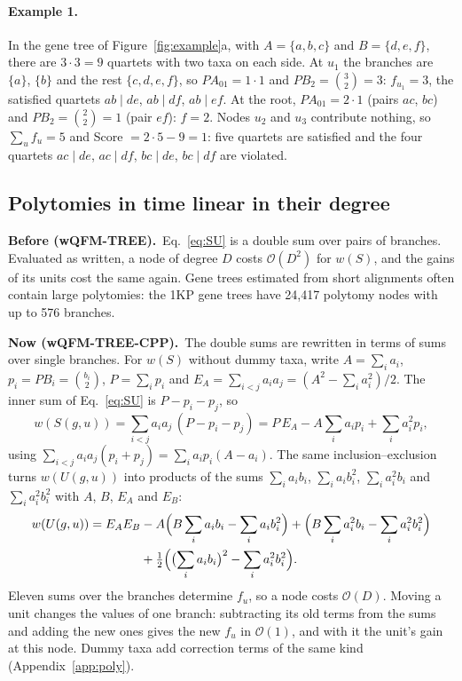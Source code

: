\documentclass[11pt,a4paper]{article}
\newcommand{\wqfmtree}{wQFM-TREE}
\newcommand{\cpp}{wQFM-TREE-CPP}
\newcommand{\Oh}{\mathcal{O}}
\newcommand{\Before}{\par\smallskip\noindent\textbf{\textcolor{beforec}{Before (\wqfmtree).}}\ }
\newcommand{\Now}{\par\smallskip\noindent\textbf{\textcolor{nowc}{Now (\cpp).}}\ }
\begin{document}
\paragraph{Example 1.} In the gene tree of Figure~\ref{fig:example}a, with $A=\{a,b,c\}$ and
$B=\{d,e,f\}$, there are $3\cdot3=9$ quartets with two taxa on each side. At $u_1$ the branches are
$\{a\}$, $\{b\}$ and the rest $\{c,d,e,f\}$, so $PA_{01}=1\cdot1$ and $PB_2=\binom32=3$: $f_{u_1}=3$,
the satisfied quartets $ab\mid de$, $ab\mid df$, $ab\mid ef$. At the root, $PA_{01}=2\cdot1$ (pairs
$ac$, $bc$) and $PB_2=\binom22=1$ (pair $ef$): $f=2$. Nodes $u_2$ and $u_3$ contribute nothing, so
$\sum_u f_u=5$ and Score $=2\cdot5-9=1$: five quartets are satisfied and the four quartets
$ac\mid de$, $ac\mid df$, $bc\mid de$, $bc\mid df$ are violated.

\subsection{Polytomies in time linear in their degree}\label{sec:closed}

\Before Eq.~\eqref{eq:SU} is a double sum over pairs of branches. Evaluated as written, a node of
degree $D$ costs $\Oh(D^2)$ for $w(S)$, and the gains of its units cost the same again. Gene trees
estimated from short alignments often contain large polytomies: the 1KP gene trees have 24{,}417
polytomy nodes with up to 576 branches.

\Now The double sums are rewritten in terms of sums over single branches. For $w(S)$ without dummy
taxa, write $A=\sum_ia_i$, $p_i=PB_i=\binom{b_i}{2}$, $P=\sum_ip_i$ and
$E_A=\sum_{i<j}a_ia_j=(A^2-\sum_ia_i^2)/2$. The inner sum of Eq.~\eqref{eq:SU} is
$P-p_i-p_j$, so
\begin{equation}\label{eq:S-closed}
  w(S(g,u)) = \sum_{i<j}a_ia_j\,(P-p_i-p_j)
  = P\,E_A - A\sum_i a_ip_i + \sum_i a_i^2p_i ,
\end{equation}
using $\sum_{i<j}a_ia_j(p_i+p_j)=\sum_{i}a_ip_i(A-a_i)$. The same inclusion--exclusion turns
$w(U(g,u))$ into products of the sums $\sum_ia_ib_i$, $\sum_ia_ib_i^2$, $\sum_ia_i^2b_i$ and
$\sum_ia_i^2b_i^2$ with $A$, $B$, $E_A$ and $E_B$:
\begin{equation}\label{eq:U-closed}
\begin{split}
  w(U(g,u)) = E_AE_B &- A\Bigl(B\sum_i a_ib_i - \sum_i a_ib_i^2\Bigr)
     + \Bigl(B\sum_i a_i^2b_i - \sum_i a_i^2b_i^2\Bigr)\\
     &+ \tfrac12\Bigl(\bigl(\sum_i a_ib_i\bigr)^2 - \sum_i a_i^2b_i^2\Bigr).
\end{split}
\end{equation}
Eleven sums over the branches determine $f_u$, so a node costs $\Oh(D)$. Moving a unit changes the
values of one branch: subtracting its old terms from the sums and adding the new ones gives the new
$f_u$ in $\Oh(1)$, and with it the unit's gain at this node. Dummy taxa add correction terms of the
same kind (Appendix~\ref{app:poly}).
\end{document}
